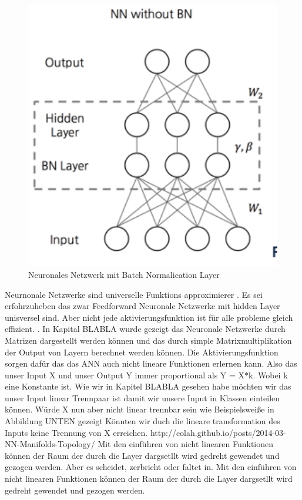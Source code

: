 \documentclass{llncs}
\begin{document}
\begin{figure}[htbp] 
	\centering
	\includegraphics[width=1.0\textwidth]{batchnorm.png}
	\caption[aaaa]{Neuronales Netzwerk mit Batch Normalication Layer}
	\label{fig:Bild1}
\end{figure}

Neurnonale Netzwerke sind universelle Funktions approximierer \cite{universal}. Es sei erfohrzuheben das zwar Feedforward Neuronale Netzwerke mit hidden Layer unisversel sind. Aber nicht jede aktivierungsfunktion ist für alle probleme gleich effizient. \cite{universal}.
In Kapital BLABLA wurde gezeigt das Neuronale Netzwerke durch Matrizen dargestellt werden können und das durch simple Matrixmultiplikation der Output von Layern berechnet werden können. Die Aktivierungsfunktion sorgen dafür das das ANN auch nicht lineare Funktionen erlernen kann. Also das unser Input X und unser Output Y immer proportional als Y = X$*$k. Wobei k eine Konstante ist.  Wie wir in Kapitel BLABLA gesehen habe möchten wir das unser Input linear Trennpaar ist damit wir unsere Input in Klassen einteilen können. Würde X nun aber nicht linear trennbar sein wie Beispielsweiße in Abbildung UNTEN gezeigt Könnten wir duch die lineare transformation des Inputs keine Trennung von X erreichen. http://colah.github.io/posts/2014-03-NN-Manifolds-Topology/ Mit den einführen von nicht linearen Funktionen können der Raum der durch die Layer dargsetllt wird gedreht gewendet und gezogen werden. Aber es scheidet, zerbricht oder faltet in.  Mit den einführen von nicht linearen Funktionen können der Raum der durch die Layer dargsetllt wird gedreht gewendet und gezogen werden.
\end{document}
